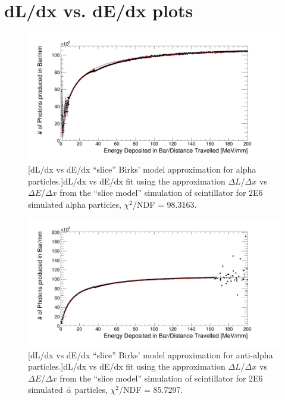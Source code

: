 
\chapter{dL/dx vs. dE/dx plots} \label{appendixD:dldxVsDedxPlots}

\begin{figure}[htbp]
 \centering
 \includegraphics[width=\linewidth]{Appendix4/Figs/newNewDldxVsDeDx/alphaDeDxDlDx.png}
 [dL/dx vs dE/dx ``slice'' Birks' model approximation for alpha particles.]{dL/dx vs dE/dx fit using the approximation $\Delta L$/$\Delta x$ vs $\Delta E$/$\Delta x$ from the ``slice model'' simulation of scintillator for 2E6 simulated alpha particles, $\chi^2$/NDF = 98.3163.} 
 \label{fig:slice_Alpha_dl_dx} 
\end{figure}

\begin{figure}[htbp]
 \centering
 \includegraphics[width=\linewidth]{Appendix4/Figs/newNewDldxVsDeDx/antiAlphaDeDxDlDx.png}
 [dL/dx vs dE/dx ``slice'' Birks' model approximation for anti-alpha particles.]{dL/dx vs dE/dx fit using the approximation $\Delta L$/$\Delta x$ vs $\Delta E$/$\Delta x$ from the ``slice model'' simulation of scintillator for 2E6 simulated $\Bar{\alpha}$ particles, $\chi^2$/NDF = 85.7297.} 
 \label{fig:slice_AAlpha_dl_dx}
\end{figure}


